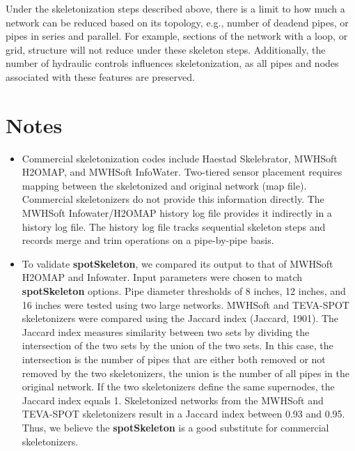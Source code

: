 Under the skeletonization steps described above, there is a limit to how much a network can be reduced based on its topology, e.g., number of deadend pipes, or pipes in series and parallel.  For example, sections of the network with a loop, or grid, structure will not reduce under these skeleton steps.  Additionally, the number of hydraulic controls influences skeletonization, as all pipes and nodes associated with these features are preserved.

\section{Notes}\label{skelExecutable_picoNotes}

\begin{itemize}
\item Commercial skeletonization codes include Haestad Skelebrator, MWHSoft H2OMAP, and MWHSoft InfoWater.  Two-tiered sensor placement requires mapping between the skeletonized and original network (map file).  Commercial skeletonizers do not provide this information directly.  The MWHSoft Infowater/H2OMAP history log file provides it indirectly in a history log file.  The history log file tracks sequential skeleton steps and records merge and trim operations on a pipe-by-pipe basis.    
\end{itemize} 

\begin{itemize}
\item To validate {\bfseries spotSkeleton}, we compared its output to that of MWHSoft H2OMAP and Infowater.  Input parameters were chosen to match {\bfseries spotSkeleton} options.  Pipe diameter thresholds of 8 inches, 12 inches, and 16 inches were tested using two large networks.  MWHSoft and TEVA-SPOT skeletonizers were compared using the Jaccard index (Jaccard, 1901).  The Jaccard index measures similarity between two sets by dividing the intersection of the two sets by the union of the two sets.  In this case, the intersection is the number of pipes that are either both removed or not removed by the two skeletonizers, the union is the number of all pipes in the original network.  If the two skeletonizers define the same supernodes, the Jaccard index equals 1.  Skeletonized networks from the MWHSoft and TEVA-SPOT skeletonizers result in a Jaccard index between 0.93 and 0.95.  Thus, we believe the {\bfseries spotSkeleton} is a good substitute for commercial skeletonizers.  
\end{itemize}

